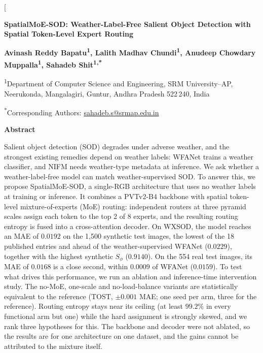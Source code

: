 \documentclass[10pt,a4paper,twocolumn,twoside]{article}
\begin{document}
\twocolumn[{%
\begin{@twocolumnfalse}
\vspace{16pt}
{\raggedright\sffamily\bfseries\fontsize{17}{20.5}\selectfont
SpatialMoE-SOD: Weather-Label-Free Salient Object Detection with Spatial Token-Level Expert Routing\par}
\vspace{11pt}
{\centering\sffamily\bfseries\fontsize{9}{11}\selectfont
Avinash Reddy Bapatu\textsuperscript{1}, Lalith Madhav Chundi\textsuperscript{1},
Anudeep Chowdary Muppalla\textsuperscript{1}, Sahadeb Shit\textsuperscript{1,*}\par}
\vspace{6pt}
{\centering\fontsize{9.5}{11.5}\selectfont
\textsuperscript{1}Department of Computer Science and Engineering, SRM University--AP,
Neerukonda, Mangalagiri, Guntur, Andhra Pradesh 522\,240, India\par}
\vspace{4pt}
{\centering\fontsize{9.5}{11.5}\selectfont
\textsuperscript{*}Corresponding Authors: \url{sahadeb.s@srmap.edu.in}\par}
\vspace{14pt}
{\sffamily\bfseries\fontsize{9}{11}\selectfont Abstract\par}
\vspace{3pt}
{\fontsize{8.7}{10.6}\selectfont\noindent
Salient object detection (SOD) degrades under adverse weather, and the strongest existing remedies depend on weather labels: WFANet trains a weather classifier, and NIFM needs weather-type metadata at inference. We ask whether a weather-label-free model can match weather-supervised SOD. To answer this, we propose SpatialMoE-SOD, a single-RGB architecture that uses no weather labels at training or inference. It combines a PVTv2-B4 backbone with spatial token-level mixture-of-experts (MoE) routing: independent routers at three pyramid scales assign each token to the top 2 of 8 experts, and the resulting routing entropy is fused into a cross-attention decoder. On WXSOD, the model reaches an MAE of $0.0192$ on the 1{,}500 synthetic test images, the lowest of the 18 published entries and ahead of the weather-supervised WFANet ($0.0229$), together with the highest synthetic $S_\phi$ ($0.9140$). On the 554 real test images, its MAE of $0.0168$ is a close second, within $0.0009$ of WFANet ($0.0159$). To test what drives this performance, we run an ablation and inference-time intervention study. The no-MoE, one-scale and no-load-balance variants are statistically equivalent to the reference (TOST, $\pm0.001$ MAE; one seed per arm, three for the reference). Routing entropy stays near its ceiling (at least $99.2\%$ in every functional arm but one) while the hard assignment is strongly skewed, and we rank three hypotheses for this. The backbone and decoder were not ablated, so the results are for one architecture on one dataset, and the gains cannot be attributed to the mixture itself.\par}

\end{@twocolumnfalse}}
\end{document}
